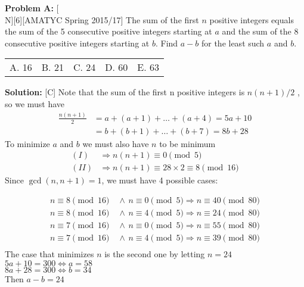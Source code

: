 \documentclass[12pt]{article}
\makeatletter
\newcounter{problem}
\newenvironment{problem}[1]{%
    \stepcounter{problem}
    \noindent\textbf{Problem A\theproblem:} #1
    \\[1em]
}{}
\newcommand{\multChoice}[5]{%
    \begin{tabular}{l @{\hskip 1.5cm} l @{\hskip 1.5cm} l @{\hskip 1.5cm} l @{\hskip 1.5cm} l}
    A. #1 & B. #2 & C. #3 & D. #4 & E. #5
    \end{tabular}
}
\newenvironment{solution}{%
    \vspace{1em}
    \noindent\textbf{Solution:} 
}{}
\makeatother
\begin{document}
\begin{problem}[N][6][AMATYC Spring 2015/17]
   The sum of the first $n$ positive integers equals the sum of the 5 consecutive
    positive integers starting at $a$ and the sum of the 8 consecutive positive
    integers starting at $b$. Find $a-b$ for the least such $a$ and $b$.
\end{problem}
\multChoice{16}{21}{24}{60}{63}
\begin{solution}[C]
   Note that the sum of the first n positive integers is $n(n+1)/2$ , so we must have
    \begin{align}
        \frac{n(n+1)}{2} &= a+(a+1)+\ldots+(a+4) = 5a+10 \tag{I} \label{eq:1}\\
        &= b+(b+1)+\ldots+(b+7) = 8b+28 \tag{II} \label{eq:1}
    \end{align}
    To minimize $a$ and $b$ we must also have $n$ to be minimum 
    \begin{align*}
        (I) &\Rightarrow n(n+1) \equiv 0 \pmod5 \\
        (II) &\Rightarrow n(n+1) \equiv 28 \times 2 \equiv 8 \pmod{16}
    \end{align*}
    Since $\gcd(n,n+1) = 1$, we must have 4 possible cases:
    
    \begin{align*}
        n \equiv 8 \pmod{16} \hspace{5pt} &\land \hspace{5pt} n \equiv 0 \pmod5 \Rightarrow n \equiv 40 \pmod{80} \\
        n \equiv 8 \pmod{16} \hspace{5pt} &\land \hspace{5pt} n \equiv 4 \pmod5 \Rightarrow n \equiv 24 \pmod{80} \\
        n \equiv 7 \pmod{16} \hspace{5pt} &\land \hspace{5pt} n \equiv 0 \pmod5 \Rightarrow n \equiv 55 \pmod{80} \\
        n \equiv 7 \pmod{16} \hspace{5pt} &\land \hspace{5pt} n \equiv 4 \pmod5 \Rightarrow n \equiv 39 \pmod{80} \\
    \end{align*}
    The case that minimizes $n$ is the second one by letting $n=24$ \\
    $5a+10=300 \iff a=58$ \\
    $8a+28=300 \iff b=34$ \\
    Then $a-b=\boxed{24}$ 
\end{solution}
\end{document}
